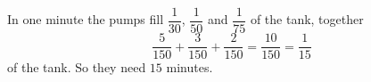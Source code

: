 In one minute the pumps fill $\dfrac{1}{30}$, $\dfrac{1}{50}$ and $\dfrac{1}{75}$ of the tank, together
\[\dfrac{5}{150}+\dfrac{3}{150}+\dfrac{2}{150}=\dfrac{10}{150}=\dfrac{1}{15}\]
of the tank. So they need $\boxed{15}$ minutes.
